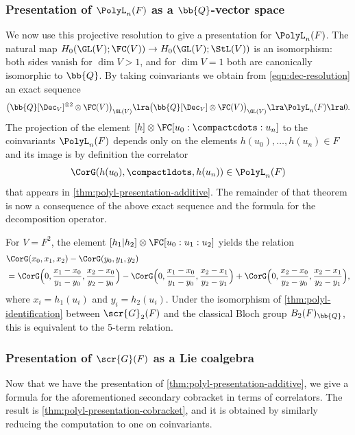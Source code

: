 \documentclass[a4paper]{amsart}
\begin{document}
\subsubsection{Presentation of $\PolyL_n(F)$ as a $\bb{Q}$-vector space} We now use this projective resolution to give a presentation for $\PolyL_n(F)$. The natural map $H_0(\GL(V);\FC(V)) \to H_0(\GL(V);\StL(V))$ is an isomorphism: both sides vanish for $\dim V>1$, and for $\dim V=1$ both are canonically isomorphic to $\bb{Q}$. By taking coinvariants we obtain from \eqref{eqn:dec-resolution} an exact sequence
\[
    \bigl(\bb{Q}[\Dec_{V}]^{\otimes 2}\otimes \FC(V)\bigr)_{\GL(V)} \lra \bigl(\bb{Q}[\Dec_{V}]\otimes \FC(V)\bigr)_{\GL(V)}  \lra \PolyL_n(F)\lra 0.
\]
The projection of the element $[h]\otimes \FC[u_0:\compactcdots:u_n]$ to the coinvariants $\PolyL_n(F)$ depends only on the elements $h(u_0), \ldots, h(u_n)\in F$ and its image is by definition the correlator
\[\CorG(h(u_0),\compactldots,h(u_n)) \in \PolyL_n(F)\] 
that appears in \cref{thm:polyl-presentation-additive}. The remainder of that theorem is now a consequence of the above exact sequence and the formula for the decomposition operator.

\begin{example*} \label{ex:decomposition weigh 2} For $V =F^2$, the element $[h_1|h_2]\otimes \FC[u_0:u_1:u_2]$ yields the relation
\begin{align*}
    &\CorG(x_0,x_1,x_2)-\CorG(y_0, y_1,y_2)\\
     &=\CorG\Bigl(0,\frac{x_1-x_0}{y_1-y_0},\frac{x_2-x_0}{y_2-y_0}\Bigr)-\CorG\Bigl(0,\frac{x_1-x_0}{y_1-y_0},\frac{x_2-x_1}{y_2-y_1}\Bigr)+\CorG\Bigl(0,\frac{x_2-x_0}{y_2-y_0},\frac{x_2-x_1}{y_2-y_1}\Bigr),
\end{align*}
where $x_i=h_1(u_i)$ and  $y_i=h_2(u_i)$. Under the isomorphism of \cref{thm:polyl-identification} between $\scr{G}_2(F)$ and the classical Bloch group $B_2(F)_\bb{Q}$, this is equivalent to the 5-term relation. 
\end{example*}

\subsubsection{Presentation of $\scr{G}(F)$ as a Lie coalgebra} Now that we have the presentation of \cref{thm:polyl-presentation-additive}, we give a formula for the aforementioned secondary cobracket in terms of correlators. The result is \cref{thm:polyl-presentation-cobracket}, and it is obtained by similarly reducing the computation to one on coinvariants. 
\end{document}
